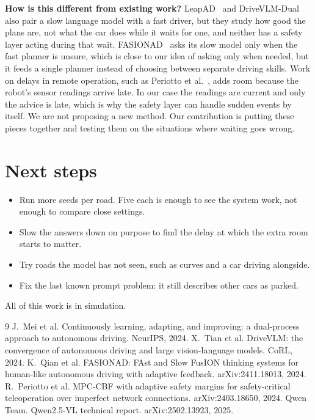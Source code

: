 \documentclass[11pt]{article}
\begin{document}
\textbf{How is this different from existing work?} LeapAD~\cite{leapad} and DriveVLM-Dual~\cite{drivevlm} also pair a slow language model with a fast driver, but they study how good the plans are, not what the car does while it waits for one, and neither has a safety layer acting during that wait. FASIONAD~\cite{fasionad} asks its slow model only when the fast planner is unsure, which is close to our idea of asking only when needed, but it feeds a single planner instead of choosing between separate driving skills. Work on delays in remote operation, such as Periotto et al.~\cite{periotto}, adds room because the robot's sensor readings arrive late. In our case the readings are current and only the advice is late, which is why the safety layer can handle sudden events by itself. We are not proposing a new method. Our contribution is putting these pieces together and testing them on the situations where waiting goes wrong.

\section{Next steps}
\begin{itemize}
\item Run more seeds per road. Five each is enough to see the system work, not enough to compare close settings.
\item Slow the answers down on purpose to find the delay at which the extra room starts to matter.
\item Try roads the model has not seen, such as curves and a car driving alongside.
\item Fix the last known prompt problem: it still describes other cars as parked.
\end{itemize}
All of this work is in simulation.

\clearpage
\footnotesize
\begin{thebibliography}{9}\setlength{\itemsep}{0pt}
 J.~Mei et al. Continuously learning, adapting, and improving: a dual-process approach to autonomous driving. NeurIPS, 2024.
 X.~Tian et al. DriveVLM: the convergence of autonomous driving and large vision-language models. CoRL, 2024.
 K.~Qian et al. FASIONAD: FAst and Slow FusION thinking systems for human-like autonomous driving with adaptive feedback. arXiv:2411.18013, 2024.
 R.~Periotto et al. MPC-CBF with adaptive safety margins for safety-critical teleoperation over imperfect network connections. arXiv:2403.18650, 2024.
 Qwen Team. Qwen2.5-VL technical report. arXiv:2502.13923, 2025.
\end{thebibliography}
\end{document}
